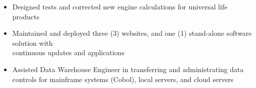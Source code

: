 
\ExperienceExpanded
{\begin{itemize}
    \item Designed tests and corrected new engine calculations for universal life products
    \item Maintained and deployed three (3) websites, and one (1) stand-alone software solution
    with \\continuous updates and applications
    \item Assisted Data Warehouse Engineer in transferring and administrating data controls for
    mainframe systems (Cobol), local servers, and cloud servers
\end{itemize}}